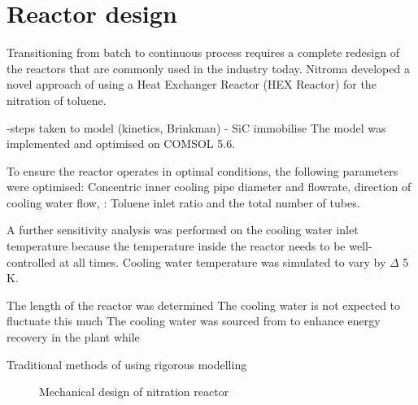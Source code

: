 \section*{Reactor design}


Transitioning from batch to continuous process requires a complete redesign of the reactors that are commonly used in the industry today. Nitroma developed a novel approach of using a Heat Exchanger Reactor (HEX Reactor) for the nitration of toluene.

-steps taken to model (kinetics, Brinkman) 
- SiC immobilise
The model was implemented and optimised on COMSOL 5.6. 

To ensure the reactor operates in optimal conditions, the following parameters were optimised: Concentric inner cooling pipe diameter and flowrate, direction of cooling water flow,  : Toluene inlet ratio and the total number of tubes.

A further sensitivity analysis was performed on the cooling water inlet temperature because the temperature inside the reactor needs to be well-controlled at all times. Cooling water temperature was simulated to vary by \mypm $\Delta$ 5 K.

The length of the reactor was determined 
The cooling water is not expected to fluctuate this much 
The cooling water was sourced from to enhance energy recovery in the plant while

Traditional methods of using 
rigorous modelling

\begin{figure}[h]
    \centering
    \caption{Mechanical design of nitration reactor}
    \label{fig:comsol-S4-CW-X-T}
\end{figure}
